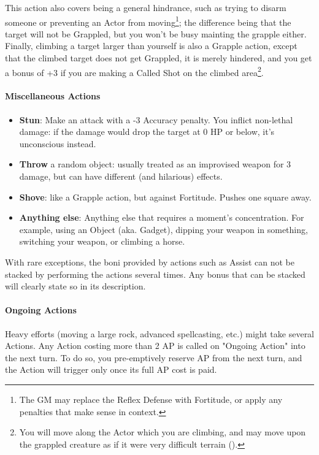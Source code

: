 \begin{itemize}
    This action also covers being a general hindrance, such as trying to disarm someone or preventing an Actor from moving\footnote{The GM may replace the Reflex Defense with Fortitude, or apply any penalties that make sense in context.}; the difference being that the target will not be Grappled, but you won't be busy mainting the grapple either. \\
    Finally, climbing a target larger than yourself is also a Grapple action, except that the climbed target does not get Grappled, it is merely hindered, and you get a bonus of +3 if you are making a Called Shot on the climbed area\footnote{You will move along the Actor which you are climbing, and may move upon the grappled creature as if it were very difficult terrain ().}.
\end{itemize}



\paragraph{Miscellaneous Actions}
\begin{itemize}
    \item \textbf{Stun}: Make an attack with a -3 Accuracy penalty. You inflict non-lethal damage: if the damage would drop the target at 0 HP or below, it's unconscious instead. 
    \item \textbf{Throw} a random object: usually treated as an improvised weapon for 3 damage, but can have different (and hilarious) effects.
    \item \textbf{Shove}: like a Grapple action, but against Fortitude. Pushes one square away.
	\item \textbf{Anything else}: Anything else that requires a moment's concentration. For example, using an Object (aka. Gadget), dipping your weapon in something, switching your weapon, or climbing a horse.
\end{itemize}

With rare exceptions, the boni provided by actions such as Assist can not be stacked by performing the actions several times. Any bonus that can be stacked will clearly state so in its description.

\paragraph{Ongoing Actions} 

Heavy efforts (moving a large rock, advanced spellcasting, etc.) might take several Actions. 
Any Action costing more than 2 AP is called on "Ongoing Action" into the next turn. To do so, you pre-emptively reserve AP from the next turn, and the Action will trigger only once its full AP cost is paid.

